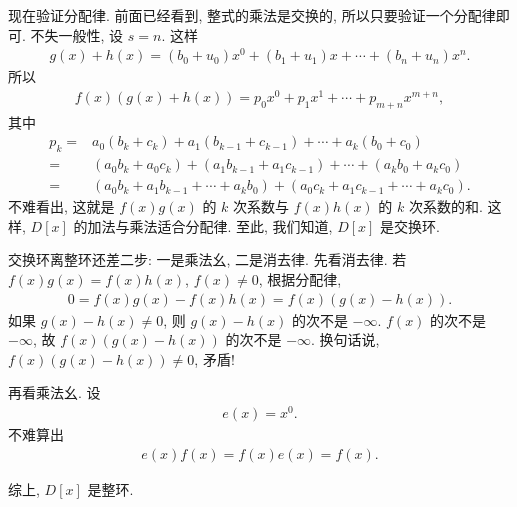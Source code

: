 \begin{pf}
    现在验证分配律. 前面已经看到, 整式的乘法是交换的, 所以只要验证一个分配律即可. 不失一般性, 设 $s=n$. 这样
    \begin{align*}
        g(x) + h(x) = (b_0 + u_0) x^0 + (b_1 + u_1) x + \cdots + (b_n + u_n) x^n.
    \end{align*}
    所以
    \begin{align*}
        f(x) (g(x) + h(x)) = p_0 x^0 + p_1 x^1 + \cdots + p_{m+n} x^{m+n},
    \end{align*}
    其中
    \begin{align*}
        p_k
        = {} & a_0 (b_k + c_k) + a_1 (b_{k-1} + c_{k-1}) + \cdots + a_k (b_0 + c_0)                     \\
        = {} & (a_0 b_k + a_0 c_k) + (a_1 b_{k-1} + a_1 c_{k-1}) + \cdots + (a_k b_0 + a_k c_0)         \\
        = {} & (a_0 b_k + a_1 b_{k-1} + \cdots + a_k b_0) + (a_0 c_k + a_1 c_{k-1} + \cdots + a_k c_0).
    \end{align*}
    不难看出, 这就是 $f(x)g(x)$ 的 $k$ 次系数与 $f(x)h(x)$ 的 $k$ 次系数的和. 这样, $D[x]$ 的加法与乘法适合分配律. 至此, 我们知道, $D[x]$ 是交换环.

    交换环离整环还差二步: 一是乘法幺, 二是消去律. 先看消去律. 若 $f(x)g(x) = f(x)h(x)$, $f(x) \neq 0$, 根据分配律,
    \begin{align*}
        0 = f(x)g(x) - f(x)h(x) = f(x) (g(x) - h(x)).
    \end{align*}
    如果 $g(x) - h(x) \neq 0$, 则 $g(x) - h(x)$ 的次不是 $-\infty$. $f(x)$ 的次不是 $-\infty$, 故 $f(x)(g(x) - h(x))$ 的次不是 $-\infty$. 换句话说, $f(x)(g(x) - h(x)) \neq 0$, 矛盾!

    再看乘法幺. 设
    \begin{align*}
        e(x) = x^0.
    \end{align*}
    不难算出
    \begin{align*}
        e(x) f(x) = f(x) e(x) = f(x).
    \end{align*}

    综上, $D[x]$ 是整环.
\end{pf}

